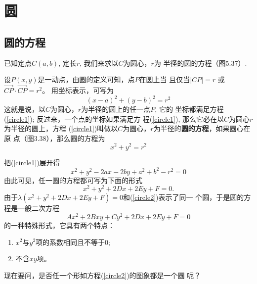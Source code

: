 \section{圆}
\subsection{圆的方程}
已知定点$C(a,b)$, 定长$r$, 我们来求以$C$为圆心，$r$为
半径的圆的方程（图5.37）.

设$P(x,y)$是一动点，由圆的定义可知，点$P$在圆上当
且仅当$|CP|=r$
或$\Vec{CP}\cdot \Vec{CP}=r^2$。
用坐标表示，可写为
\begin{equation}\label{circle1}
(x-a)^2+(y-b)^2=r^2
\end{equation}
这就是说，以$C$为圆心，$r$为半径的圆上的任一点$P$, 它的
坐标都满足方程(\ref{circle1}); 反过来，一个点的坐标如果满足方
程(\ref{circle1}), 那么它必在以$C$为圆心$r$为半径的圆上，方程
(\ref{circle1})叫做以$C$为圆心，$r$为半径的\textbf{圆的方程}，如果圆心在原
点（图3.38），那么圆的方程为
\begin{equation}
    x^2+y^2=r^2
\end{equation}

\begin{figure}[htp]\centering
    \begin{minipage}[t]{0.48\textwidth}
    \centering
    \caption{}
    \end{minipage}
    \begin{minipage}[t]{0.48\textwidth}
    \centering
    \caption{}
    \end{minipage}
    \end{figure}


把(\ref{circle1})展开得
\[x^2+y^2-2ax-2by+a^2+b^2-r^2=0\]
由此可见，任一圆的方程都可写为下面的形式
\begin{equation}\label{circle2}
    x^2+y^2+2Dx+2Ey+F=0.
\end{equation}
由于$\lambda(x^2+y^2+2Dx+2Ey+F)=0$和(\ref{circle2})表示了同一
个圆，于是圆的方程是一般二次方程
\[Ax^2+2Bxy+Cy^2+2Dx+2Ey+F=0\]
的一种特殊形式，它具有两个特点：
\begin{enumerate}
    \item $x^2$与$y^2$项的系数相同且不等于0;
    \item 不含$xy$项。
\end{enumerate}
现在要问，是否任一个形如方程(\ref{circle2})的图象都是一个圆
呢？

